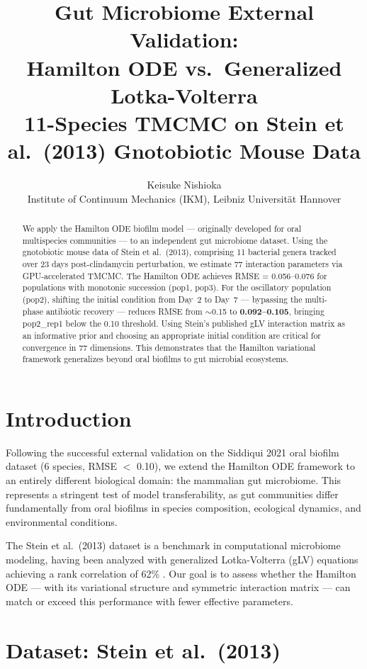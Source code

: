 \documentclass[11pt,a4paper]{article}
\title{Gut Microbiome External Validation:\\
Hamilton ODE vs.\ Generalized Lotka-Volterra\\[6pt]
\large 11-Species TMCMC on Stein et al.\ (2013) Gnotobiotic Mouse Data}
\author{Keisuke Nishioka\\
\small Institute of Continuum Mechanics (IKM), Leibniz Universit\"at Hannover}
\date{}
\begin{document}
\maketitle

\begin{abstract}
We apply the Hamilton ODE biofilm model --- originally developed for oral
multispecies communities --- to an independent gut microbiome dataset.
Using the gnotobiotic mouse data of Stein et al.\ (2013), comprising
11 bacterial genera tracked over 23 days post-clindamycin perturbation,
we estimate 77 interaction parameters via GPU-accelerated TMCMC.
The Hamilton ODE achieves RMSE = 0.056--0.076 for populations with
monotonic succession (pop1, pop3). For the oscillatory population (pop2),
shifting the initial condition from Day~2 to Day~7 --- bypassing the
multi-phase antibiotic recovery --- reduces RMSE from $\sim$0.15 to
\textbf{0.092--0.105}, bringing pop2\_rep1 below the 0.10 threshold.
Using Stein's published gLV interaction matrix as an informative prior
and choosing an appropriate initial condition are critical for convergence
in 77 dimensions. This demonstrates that the Hamilton variational framework
generalizes beyond oral biofilms to gut microbial ecosystems.
\end{abstract}

\section{Introduction}

Following the successful external validation on the Siddiqui 2021 oral
biofilm dataset (6 species, RMSE $<$ 0.10), we extend the Hamilton ODE
framework to an entirely different biological domain: the mammalian gut
microbiome. This represents a stringent test of model transferability,
as gut communities differ fundamentally from oral biofilms in species
composition, ecological dynamics, and environmental conditions.

The Stein et al.\ (2013) dataset is a benchmark in computational
microbiome modeling, having been analyzed with generalized Lotka-Volterra
(gLV) equations achieving a rank correlation of 62\% \cite{stein2013}.
Our goal is to assess whether the Hamilton ODE --- with its variational
structure and symmetric interaction matrix --- can match or exceed this
performance with fewer effective parameters.

\section{Dataset: Stein et al.\ (2013)}
\end{document}
